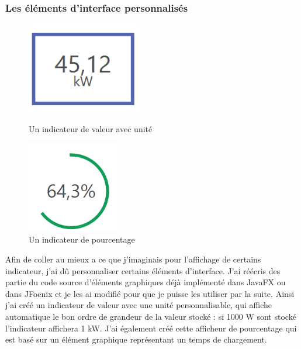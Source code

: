 \subsubsection{Les éléments d'interface personnalisés}
\begin{figure}[h!]
	\begin{minipage}{0.48\textwidth}
		\centering
		\includegraphics[height=4cm]{partie2/images/customcontrol1.png}
		\caption{Un indicateur de valeur avec unité}
	\end{minipage}\hfill
	\begin{minipage}{0.48\textwidth}
		\centering
		\includegraphics[height=4cm]{partie2/images/customcontrol2.png}
		\caption{Un indicateur de pourcentage}
	\end{minipage}\hfill
\end{figure}

Afin de coller au mieux a ce que j'imaginais pour l'affichage de certains indicateur, j'ai dû personnaliser certains éléments d'interface. J'ai réécris des partie du code source d'éléments graphiques déjà implémenté dans JavaFX ou dans JFoenix et je les ai modifié pour que je puisse les utiliser par la suite. Ainsi j'ai créé un indicateur de valeur avec une unité personnalisable, qui affiche automatique le bon ordre de grandeur de la valeur stocké : si 1000 W sont stocké  l'indicateur affichera 1 kW. J'ai également créé cette afficheur de pourcentage qui est basé sur un élément graphique représentant un temps de chargement.\\

